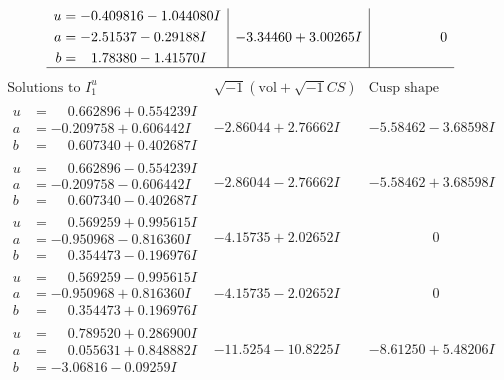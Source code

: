 \documentclass[1p]{elsarticle_modified}
\theoremstyle{definition}
\newcommand{\I}{\sqrt{-1}}
\begin{document}
$$\begin{array}{c|c|c}
\begin{aligned}
u &= -0.409816 - 1.044080 I \\
a &= -2.51537 - 0.29188 I \\
b &= \phantom{-}1.78380 - 1.41570 I\end{aligned}
 & -3.34460 + 3.00265 I & \phantom{-0.000000 } 0\\
 \hline 
 \end{array}$$\newpage$$\begin{array}{c|c|c}  
\text{Solutions to }I^u_{1}& \I (\text{vol} + \sqrt{-1}CS) & \text{Cusp shape}\\
 \hline 
\begin{aligned}
u &= \phantom{-}0.662896 + 0.554239 I \\
a &= -0.209758 + 0.606442 I \\
b &= \phantom{-}0.607340 + 0.402687 I\end{aligned}
 & -2.86044 + 2.76662 I & -5.58462 - 3.68598 I \\ \hline\begin{aligned}
u &= \phantom{-}0.662896 - 0.554239 I \\
a &= -0.209758 - 0.606442 I \\
b &= \phantom{-}0.607340 - 0.402687 I\end{aligned}
 & -2.86044 - 2.76662 I & -5.58462 + 3.68598 I \\ \hline\begin{aligned}
u &= \phantom{-}0.569259 + 0.995615 I \\
a &= -0.950968 - 0.816360 I \\
b &= \phantom{-}0.354473 - 0.196976 I\end{aligned}
 & -4.15735 + 2.02652 I & \phantom{-0.000000 } 0 \\ \hline\begin{aligned}
u &= \phantom{-}0.569259 - 0.995615 I \\
a &= -0.950968 + 0.816360 I \\
b &= \phantom{-}0.354473 + 0.196976 I\end{aligned}
 & -4.15735 - 2.02652 I & \phantom{-0.000000 } 0 \\ \hline\begin{aligned}
u &= \phantom{-}0.789520 + 0.286900 I \\
a &= \phantom{-}0.055631 + 0.848882 I \\
b &= -3.06816 - 0.09259 I\end{aligned}
 & -11.5254 - 10.8225 I & -8.61250 + 5.48206 I \\ \hline\begin{aligned}

\end{aligned}
\end{array}$$
\end{document}
